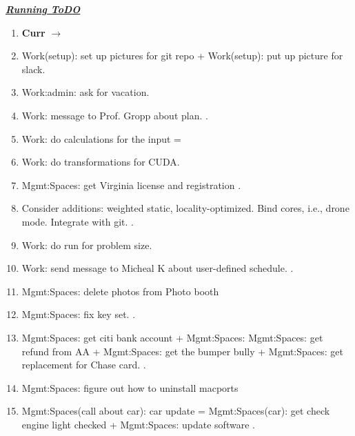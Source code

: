         \underline{\bf \it Running ToDO} \\
        \begin{enumerate}

           
          \small \item \small \textbf{Curr} $\rightarrow$
        \item \small Work(setup): set up pictures for git repo + Work(setup): put up picture for slack. 
          
        \item \small Work:admin: ask for vacation.   

        \item \small Work: message to Prof. Gropp about plan.   . 
        \item \small Work: do calculations for the input =   
        \item \small Work: do transformations for CUDA.  

        \item \small Mgmt:Spaces: get Virginia license and
        registration .

        \item Consider additions: weighted static,
          locality-optimized. Bind cores, i.e., drone mode. Integrate
          with git.    .

        \item \small Work: do run for problem size.  
        \item \small Work: send message to Micheal K about user-defined
          schedule. . 

        \item \small Mgmt:Spaces: delete photos from Photo booth 
      
        \item \small Mgmt:Spaces: fix key set. . 
        \item \small Mgmt:Spaces: get citi bank account +  Mgmt:Spaces:
          Mgmt:Spaces: get refund from AA  + Mgmt:Spaces: get the
          bumper bully +  Mgmt:Spaces: get replacement for Chase card. .
          \item \small Mgmt:Spaces: figure out how to uninstall macports 
           
        \item \small Mgmt:Spaces(call about car): car update = Mgmt:Spaces(car): get check engine light checked +  Mgmt:Spaces: update software . 
 

\end{enumerate}
